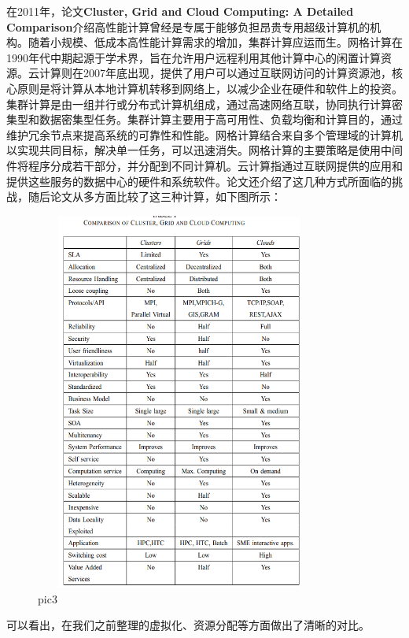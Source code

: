 \documentclass[a4paper,twoside]{scrbook}
\begin{document}
在2011年，论文\textbf{Cluster, Grid and Cloud Computing: A Detailed Comparison}介绍高性能计算曾经是专属于能够负担昂贵专用超级计算机的机构。随着小规模、低成本高性能计算需求的增加，集群计算应运而生。网格计算在1990年代中期起源于学术界，旨在允许用户远程利用其他计算中心的闲置计算资源。云计算则在2007年底出现，提供了用户可以通过互联网访问的计算资源池，核心原则是将计算从本地计算机转移到网络上，以减少企业在硬件和软件上的投资。集群计算是由一组并行或分布式计算机组成，通过高速网络互联，协同执行计算密集型和数据密集型任务。集群计算主要用于高可用性、负载均衡和计算目的，通过维护冗余节点来提高系统的可靠性和性能。网格计算结合来自多个管理域的计算机以实现共同目标，解决单一任务，可以迅速消失。网格计算的主要策略是使用中间件将程序分成若干部分，并分配到不同计算机。云计算指通过互联网提供的应用和提供这些服务的数据中心的硬件和系统软件。论文还介绍了这几种方式所面临的挑战，随后论文从多方面比较了这三种计算，如下图所示：
\begin{figure}
\centering %
\includegraphics[height=12.5cm,width=9.5cm]{c c g compaerd.png}
\caption{pic3}
\end{figure}
可以看出，在我们之前整理的虚拟化、资源分配等方面做出了清晰的对比。
\end{document}
